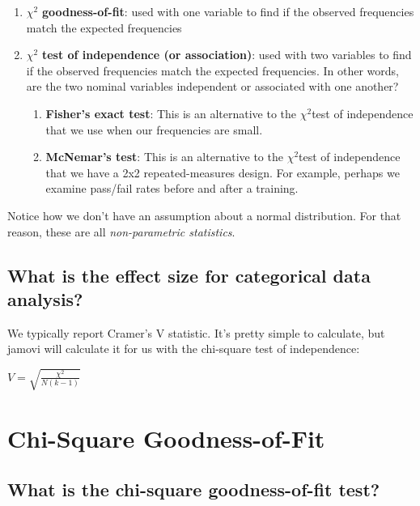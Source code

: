 \documentclass[
]{book}
\begin{document}
\begin{enumerate}
\def\labelenumi{\arabic{enumi}.}
\item
  \(\chi^2\) \textbf{goodness-of-fit}: used with one variable to find if the observed frequencies match the expected frequencies
\item
  \(\chi^2\) \textbf{test of independence (or association)}: used with two variables to find if the observed frequencies match the expected frequencies. In other words, are the two nominal variables independent or associated with one another?

  \begin{enumerate}
  \def\labelenumii{\arabic{enumii}.}
  \item
    \textbf{Fisher's exact test}: This is an alternative to the \(\chi^2\)test of independence that we use when our frequencies are small.
  \item
    \textbf{McNemar's test}: This is an alternative to the \(\chi^2\)test of independence that we have a 2x2 repeated-measures design. For example, perhaps we examine pass/fail rates before and after a training.
  \end{enumerate}
\end{enumerate}

Notice how we don't have an assumption about a normal distribution. For that reason, these are all \emph{non-parametric statistics}.

\hypertarget{what-is-the-effect-size-for-categorical-data-analysis}{%
\section{What is the effect size for categorical data analysis?}\label{what-is-the-effect-size-for-categorical-data-analysis}}

We typically report Cramer's V statistic. It's pretty simple to calculate, but jamovi will calculate it for us with the chi-square test of independence:

\(V = \sqrt{\frac{\chi^2}{N(k-1)}}\)

\hypertarget{chi-square-goodness-of-fit}{%
\chapter{Chi-Square Goodness-of-Fit}\label{chi-square-goodness-of-fit}}

\hypertarget{what-is-the-chi-square-goodness-of-fit-test}{%
\section{What is the chi-square goodness-of-fit test?}\label{what-is-the-chi-square-goodness-of-fit-test}}
\end{document}
